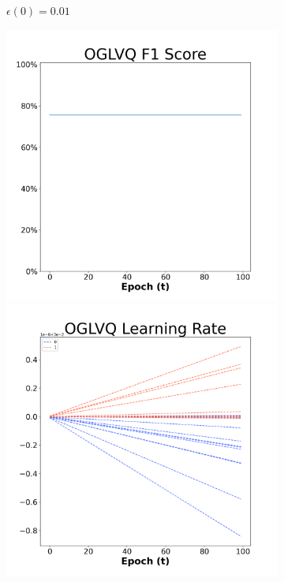 \begin{figure}[H]
\begin{subfigure}{0.3\textwidth}
  \caption{$\epsilon(0)=0.01$}
\end{subfigure}\hfil %
\begin{subfigure}{0.3\textwidth}
  \includegraphics[width=\linewidth]{images/exper2/NSP/OGLVQ_0.03_f1.png}
  \includegraphics[width=\linewidth]{images/exper2/NSP/OGLVQ_0.03_lr.png}

\end{subfigure}
\end{figure}

